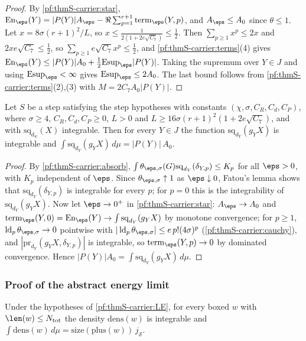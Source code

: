 \begin{proof}
By \cref{pf:thmS-carrier:star}, $\mathrm{En}_\eps(Y)=|P(Y)|A_\eps-\Re\sum_{p=1}^{r+1}\mathrm{term}_\eps(Y,p)$, and $A_\eps\le
A_0$ since $\theta\le1$. Let $x=8\sigma(r+1)^2/L$, so $x\le\frac1{2(1+2e\sqrt{C_7})}\le\frac12$. Then $\sum_{p\ge1}x^p\le2x$
and $2xe\sqrt{C_7}\le\frac12$, so $\sum_{p\ge1}e\sqrt{C_7}x^p\le\frac12$, and \cref{pf:thmS-carrier:terms}(4) gives
$\mathrm{En}_\eps(Y)\le|P(Y)|A_0+\frac12\mathrm{Esup}_\eps|P(Y)|$. Taking the supremum over $Y\in J$ and using
$\mathrm{Esup}_\eps<\infty$ gives $\mathrm{Esup}_\eps\le2A_0$. The last bound follows from \cref{pf:thmS-carrier:terms}(2),(3)
with $M=2C_7A_0|P(Y)|$.
\end{proof}

\begin{theorem}\label{pf:thmS-carrier:stepclaim}
Let $S$ be a step satisfying the step hypotheses with constants $(\chi,\sigma,C_R,C_d,C_P)$, where $\sigma\ge4$,
$C_R,C_d,C_P\ge0$, $L>0$ and $L\ge16\sigma(r+1)^2(1+2e\sqrt{C_7})$, and with $\mathrm{sq}_{d_w}(X)$ integrable. Then for every
$Y\in J$ the function $\mathrm{sq}_{d_Y}(g_YX)$ is integrable and $\int\mathrm{sq}_{d_Y}(g_YX)\,d\mu=|P(Y)|\,A_0$.
\end{theorem}

\begin{proof}
By \cref{pf:thmS-carrier:absorb}, $\int\theta_{\eps,\sigma}(G)\mathrm{sq}_{d_Y}(\delta_{Y,p})\le K_p$ for all $\eps>0$, with $K_p$
independent of $\eps$. Since $\theta_{\eps,\sigma}\uparrow1$ as $\eps\downarrow0$, Fatou's lemma shows that
$\mathrm{sq}_{d_Y}(\delta_{Y,p})$ is integrable for every $p$; for $p=0$ this is the integrability of
$\mathrm{sq}_{d_Y}(g_YX)$. Now let $\eps\to0^+$ in \cref{pf:thmS-carrier:star}: $A_\eps\to A_0$ and
$\mathrm{term}_\eps(Y,0)=\mathrm{En}_\eps(Y)\to\int\mathrm{sq}_{d_Y}(g_YX)$ by monotone convergence; for $p\ge1$,
$\thmScarrierld_p\theta_{\eps,\sigma}\to0$ pointwise with $|\thmScarrierld_p\theta_{\eps,\sigma}|\le e\,p!(4\sigma)^p$
(\cref{pf:thmS-carrier:cauchy}), and $|\mathrm{pr}_{d_Y}(g_YX,\delta_{Y,p})|$ is integrable, so $\mathrm{term}_\eps(Y,p)\to0$ by
dominated convergence. Hence $|P(Y)|A_0=\int\mathrm{sq}_{d_Y}(g_YX)\,d\mu$.
\end{proof}

\subsubsection{Proof of the abstract energy limit}
\begin{lemma}\label{pf:thmS-carrier:claims}
Under the hypotheses of \cref{pf:thmS-carrier:LE}, for every boxed $w$ with $\len(w)\le N_{\mathrm{tot}}$ the density
$\mathrm{dens}(w)$ is integrable and $\int\mathrm{dens}(w)\,d\mu=\mathrm{size}(\mathrm{plus}(w))\,j_{\mathcal S}$.
\end{lemma}

